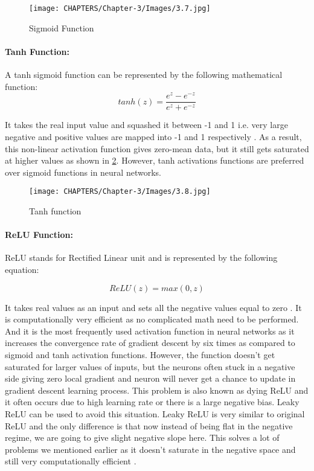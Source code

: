 \begin{figure}[H]
	\centering
		\texttt{[image: CHAPTERS/Chapter-3/Images/3.7.jpg]}
	\caption{Sigmoid Function}
	\label{fig:3.7}
\end{figure}
\paragraph*{Tanh Function:}
A tanh sigmoid function can be represented by the following mathematical function:
\begin{equation}
	tanh(z) = \frac{e^{z}-e^{-z}}{e^{z}+e^{-z}}
\end{equation}

It takes the real input value and squashed it between -1 and 1 i.e. very 
large negative and positive values are mapped into -1 and 1 respectively \cite{chap_3_article:5}. As 
a result, this non-linear activation function gives zero-mean data, but it 
still gets saturated at higher values as shown in \ref{fig:3.8}. However, tanh 
activations functions are preferred over sigmoid functions in neural networks.

\begin{figure}[H]
	\centering
		\texttt{[image: CHAPTERS/Chapter-3/Images/3.8.jpg]}
	\caption{Tanh function}
	\label{fig:3.8}
\end{figure}

\paragraph*{ReLU Function:}
ReLU stands for Rectified Linear unit and is represented by the following equation:

\begin{equation}
	ReLU(z) = max(0,z)
\end{equation}

It takes real values as an input and sets all the negative 
values equal to zero \cite{chap_3_article:3}. It is computationally very efficient as no 
complicated math need to be performed. And it is the most frequently used 
activation function in neural networks as it increases the convergence rate 
of gradient descent by six times as compared to sigmoid and tanh activation 
functions. However, the function doesn’t get saturated for larger values of 
inputs, but the neurons often stuck in a negative side giving zero local gradient 
and neuron will never get a chance to update in gradient descent learning process. 
This problem is also known as dying ReLU and it often occurs due to high learning 
rate or there is a large negative bias. Leaky ReLU can be used to avoid this 
situation. Leaky ReLU is very similar to original ReLU and the only difference 
is that now instead of being flat in the negative regime, we are going to give 
slight negative slope here. This solves a lot of problems we mentioned earlier
as it doesn’t saturate in the negative space and still very computationally efficient \cite{chap_3_article:3}.


